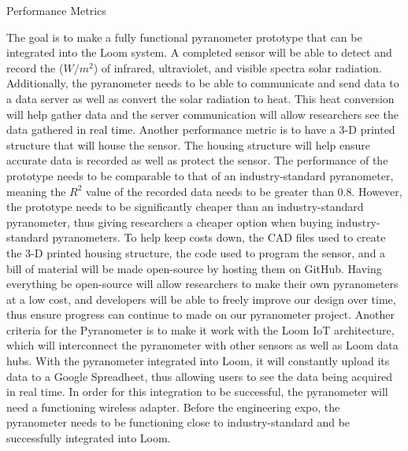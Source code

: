 \documentclass[10pt,draftclsnofoot,onecolumn,letterpaper]{article}
\begin{document}
\vspace{\baselineskip}
\begin{Center}
{\fontsize{14pt}{16.8pt}\selectfont Performance Metrics\par}
\end{Center}\par
    
{\fontsize{10pt}{12.0pt}\selectfont
The goal is to make a fully functional pyranometer prototype that can be integrated into the Loom system. A completed sensor will be able to detect and record the ($W/m^2$) of infrared, ultraviolet, and visible spectra solar radiation. Additionally, the pyranometer needs to be able to communicate and send data to a data server as well as convert the solar radiation to heat. This heat conversion will help gather data and the server communication will allow researchers see the data gathered in real time. Another performance metric is to have a 3-D printed structure that will house the sensor. The housing structure will help ensure accurate data is recorded as well as protect the sensor. The performance of the prototype needs to be comparable to that of an industry-standard pyranometer, meaning the $R^2$ value of the recorded data needs to be greater than 0.8. However, the prototype needs to be significantly cheaper than an industry-standard pyranometer, thus giving researchers a cheaper option when buying industry-standard pyranometers. To help keep costs down, the CAD files used to create the 3-D printed housing structure, the code used to program the sensor, and a bill of material will be made open-source by hosting them on GitHub. Having everything be open-source will allow researchers to make their own pyranometers at a low cost, and developers will be able to freely improve our design over time, thus ensure progress can continue to made on our pyranometer project. Another criteria for the Pyranometer is to make it work with the Loom IoT architecture, which will interconnect the pyranometer with other sensors as well as Loom data hubs. With the pyranometer integrated into Loom, it will constantly upload its data to a Google Spreadheet, thus allowing users to see the data being acquired in real time. In order for this integration to be successful, the pyranometer will need a functioning wireless adapter. Before the engineering expo, the pyranometer needs to be functioning close to industry-standard and be successfully integrated into Loom.
\par}\par
    
\end{document}
